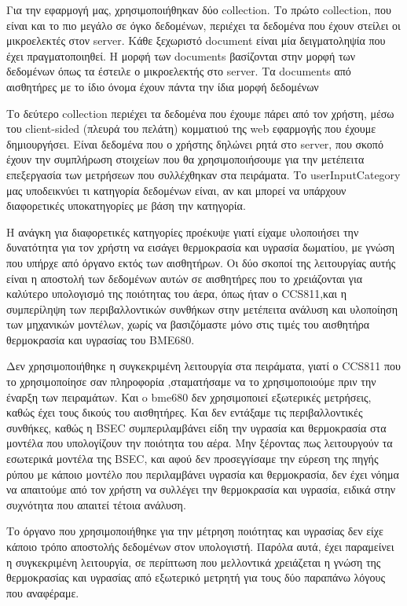 Για την εφαρμογή μας, χρησιμοποιήθηκαν δύο collection.
Το πρώτο collection, που είναι και το πιο μεγάλο σε όγκο δεδομένων, περιέχει τα δεδομένα που έχουν στείλει οι μικροελεκτές στον server.
Κάθε ξεχωριστό document είναι μία δειγματοληψία που έχει πραγματοποιηθεί.
Η μορφή των documents βασίζονται στην μορφή των δεδομένων όπως τα έστειλε ο μικροελεκτής στο server.
Τα documents από αισθητήρες με το ίδιο όνομα έχουν πάντα την ίδια μορφή δεδομένων

Το δεύτερο collection περιέχει τα δεδομένα που έχουμε πάρει από τον χρήστη, μέσω του client-sided (πλευρά του πελάτη) κομματιού της web εφαρμογής που έχουμε δημιουργήσει.
Είναι δεδομένα που ο χρήστης δηλώνει ρητά στο server, που σκοπό έχουν την συμπλήρωση στοιχείων που θα χρησιμοποιήσουμε για την μετέπειτα επεξεργασία των μετρήσεων που συλλέχθηκαν στα πειράματα.
Το userInputCategory  μας υποδεικνύει τι κατηγορία δεδομένων είναι, αν και μπορεί να υπάρχουν διαφορετικές υποκατηγορίες με βάση την κατηγορία.

Η ανάγκη για διαφορετικές κατηγορίες προέκυψε γιατί είχαμε υλοποιήσει την δυνατότητα για τον χρήστη να εισάγει θερμοκρασία και υγρασία δωματίου, με γνώση που υπήρχε από όργανο εκτός των αισθητήρων.
Οι δύο σκοποί της λειτουργίας αυτής είναι η αποστολή των δεδομένων αυτών σε αισθητήρες που το χρειάζονται για καλύτερο υπολογισμό της ποιότητας του άερα,
όπως ήταν ο CCS811,και η συμπερίληψη των περιβαλλοντικών συνθήκων στην μετέπειτα ανάλυση και υλοποίηση των μηχανικών μοντέλων, χωρίς να βασιζόμαστε μόνο στις τιμές του αισθητήρα θερμοκρασία και υγρασίας του ΒΜΕ680.

Δεν χρησιμοποιήθηκε η συγκεκριμένη λειτουργία στα πειράματα, γιατί ο CCS811 που το χρησιμοποίησε σαν πληροφορία ,σταματήσαμε να το χρησιμοποιούμε πριν την έναρξη των πειραμάτων.                                                                                                                                                  Kαι o bme680  δεν χρησιμοποιεί εξωτερικές μετρήσεις, καθώς έχει τους δικούς του αισθητήρες.
Και δεν εντάξαμε τις περιβαλλοντικές συνθήκες, καθώς η BSEC συμπεριλαμβάνει είδη την υγρασία και θερμοκρασία στα μοντέλα που υπολογίζουν την ποιότητα του αέρα.
Μην ξέροντας πως λειτουργούν τα εσωτερικά μοντέλα της BSEC, και αφού δεν προσεγγίσαμε την εύρεση της πηγής ρύπου με κάποιο μοντέλο που περιλαμβάνει υγρασία και θερμοκρασία, 
δεν έχει νόημα να απαιτούμε από τον χρήστη να συλλέγει την θερμοκρασία και υγρασία, ειδικά στην συχνότητα που απαιτεί τέτοια ανάλυση.

Το όργανο που χρησιμοποιήθηκε για την μέτρηση ποιότητας και υγρασίας δεν είχε κάποιο τρόπο αποστολής δεδομένων στον υπολογιστή.
Παρόλα αυτά, έχει παραμείνει η συγκεκριμένη λειτουργία, σε περίπτωση που μελλοντικά χρειάζεται η γνώση της θερμοκρασίας και υγρασίας από εξωτερικό μετρητή για τους δύο παραπάνω λόγους που αναφέραμε.


